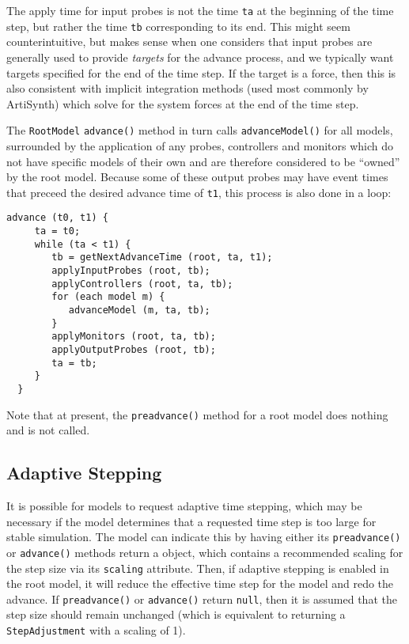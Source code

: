 \documentclass{article}
\def\mbase{artisynth.core.modelbase}
\begin{document}
\begin{sideblock}
The apply time for input probes is not the time {\tt ta}
at the beginning of the time step, but rather the time {\tt tb}
corresponding to its end. This might seem
counterintuitive, but makes sense when one considers that
input probes are generally used to provide {\it targets}
for the advance process, and we typically want targets
specified for the end of the time step. If the target is a force,
then this is also consistent with implicit integration methods (used
most commonly by ArtiSynth) which solve for the system forces
at the end of the time step.
\end{sideblock}

The {\tt RootModel} {\tt advance()} method in turn calls {\tt advanceModel()}
for all models, surrounded by the application of any
probes, controllers and monitors which do not have specific models of
their own and are therefore considered to be ``owned'' by the root
model. Because some of these output probes may have event
times that preceed the desired advance time of {\tt t1}, this process
is also done in a loop:
\begin{lstlisting}[]
  advance (t0, t1) {
     ta = t0;
     while (ta < t1) {
        tb = getNextAdvanceTime (root, ta, t1);
        applyInputProbes (root, tb);
        applyControllers (root, ta, tb);
        for (each model m) {
           advanceModel (m, ta, tb);
        }
        applyMonitors (root, ta, tb);
        applyOutputProbes (root, tb);
        ta = tb;
     }
  }
\end{lstlisting}

Note that at present, the {\tt preadvance()} method for a root model
does nothing and is not called.

\subsection{Adaptive Stepping}
\label{AdaptiveSteppingSec}

It is possible for models to request adaptive time stepping, which may
be necessary if the model determines that a requested time step is too
large for stable simulation. The model can indicate this by having
either its {\tt preadvance()} or {\tt advance()} methods return a
\javaclass[\mbase]{StepAdjustment} object, which
contains a recommended scaling for the step size via its {\tt scaling}
attribute.  Then, if adaptive stepping is enabled in the root model,
it will reduce the effective time step for the model and redo the
advance.  If {\tt preadvance()} or {\tt advance()} return {\tt null},
then it is assumed that the step size should remain unchanged (which
is equivalent to returning a {\tt StepAdjustment} with a scaling of
1).
\end{document}

